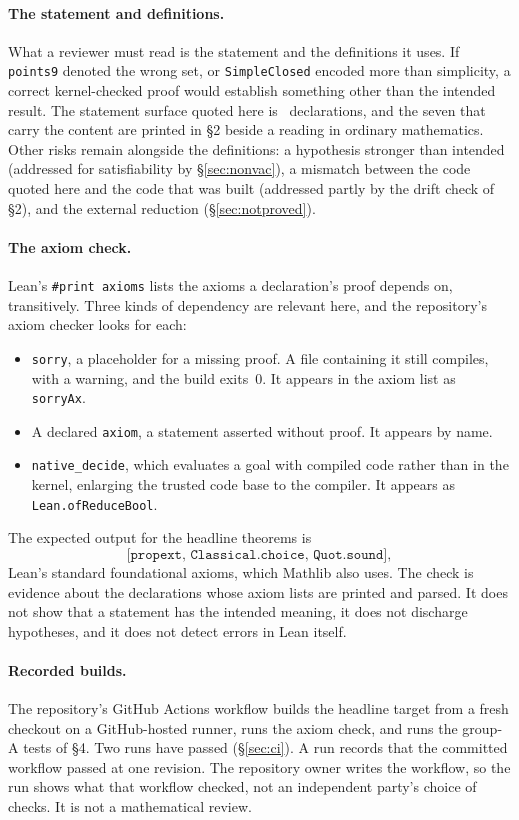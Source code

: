 \documentclass[11pt]{article}
\newcommand{\code}[1]{\texttt{\small #1}}
\begin{document}
\paragraph{The statement and definitions.} What a reviewer must read is the
statement and the definitions it uses. If \code{points9} denoted the wrong
set, or \code{SimpleClosed} encoded more than simplicity, a correct
kernel-checked proof would establish something other than the intended
result. The statement surface quoted here is \ndecls\ declarations, and the
seven that carry the content are printed in \S2 beside a reading in ordinary
mathematics. Other risks remain alongside the definitions: a hypothesis
stronger than intended (addressed for satisfiability by \S\ref{sec:nonvac}), a mismatch
between the code quoted here and the code that was built (addressed partly by
the drift check of \S2), and the external reduction (\S\ref{sec:notproved}).

\paragraph{The axiom check.}
Lean's \code{\#print axioms} lists the axioms a declaration's proof depends on,
transitively. Three kinds of dependency are relevant here, and the
repository's axiom checker looks for each:

\begin{itemize}
\item \code{sorry}, a placeholder for a missing proof. A file containing it
  still compiles, with a warning, and the build exits~0. It appears in the
  axiom list as \code{sorryAx}.
\item A declared \code{axiom}, a statement asserted without proof. It appears
  by name.
\item \code{native\_decide}, which evaluates a goal with compiled code rather
  than in the kernel, enlarging the trusted code base to the compiler. It
  appears as \code{Lean.ofReduceBool}.
\end{itemize}

The expected output for the headline theorems is
\[
  \texttt{[propext, Classical.choice, Quot.sound]},
\]
Lean's standard foundational axioms, which Mathlib also uses. The check is
evidence about the declarations whose axiom lists are printed and parsed. It
does not show that a statement has the intended meaning, it does not discharge
hypotheses, and it does not detect errors in Lean itself.

\paragraph{Recorded builds.} The repository's GitHub Actions workflow builds
the headline target from a fresh checkout on a GitHub-hosted runner, runs the
axiom check, and runs the group-A tests of \S4. Two runs have passed
(\S\ref{sec:ci}). A run records that the committed workflow passed at one
revision. The repository owner writes the workflow, so the run shows what that
workflow checked, not an independent party's choice of checks. It is not a
mathematical review.
\end{document}
